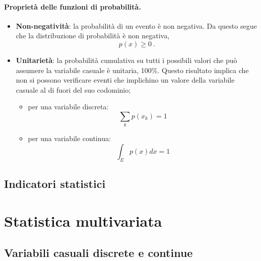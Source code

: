 \paragraph{Proprietà delle funzioni di probabilità.}
\begin{itemize}
    \item \textbf{Non-negatività}: la probabilità di un evento è non negativa. Da questo segue che la distribuzione di probabilità è non negativa,
        \begin{equation}
            p(x) \ge 0 \ .
        \end{equation}
    \item \textbf{Unitarietà}: la probabilità cumulativa su tutti i possibili valori che può assumere la variabile casuale è unitaria, 100\%. Questo risultato implica che non si possono verificare eventi che implichino un valore della variabile casuale al di fuori del suo codominio;
        \begin{itemize}
            \item per una variabile discreta:
                \begin{equation}
                    \sum_{k} p(x_k) = 1
                \end{equation}
            \item per una variabile continua:
                \begin{equation}
                    \int_E p(x) dx = 1
                \end{equation}
        \end{itemize}
\end{itemize}
\subsection{Indicatori statistici}

\section{Statistica multivariata}
\subsection{Variabili casuali discrete e continue}

